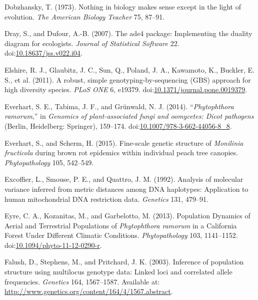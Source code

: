 \documentclass[double,12pt]{beavtex}
\begin{document}
  \hypertarget{ref-dobzhansky2013nothing}{}
  Dobzhansky, T. (1973). Nothing in biology makes sense except in the
  light of evolution. \emph{The American Biology Teacher} 75, 87--91.
  
  \hypertarget{ref-dray2007ade4}{}
  Dray, S., and Dufour, A.-B. (2007). The ade4 package: Implementing the
  duality diagram for ecologists. \emph{Journal of Statistical Software}
  22.
  doi:\href{https://doi.org/10.18637/jss.v022.i04}{10.18637/jss.v022.i04}.
  
  \hypertarget{ref-elshire2011robust}{}
  Elshire, R. J., Glaubitz, J. C., Sun, Q., Poland, J. A., Kawamoto, K.,
  Buckler, E. S., et al. (2011). A robust, simple genotyping-by-sequencing
  (GBS) approach for high diversity species. \emph{PLoS ONE} 6, e19379.
  doi:\href{https://doi.org/10.1371/journal.pone.0019379}{10.1371/journal.pone.0019379}.
  
  \hypertarget{ref-everhart2014phytophthora}{}
  Everhart, S. E., Tabima, J. F., and Grünwald, N. J. (2014).
  ``\emph{Phytophthora ramorum},'' in \emph{Genomics of plant-associated
  fungi and oomycetes: Dicot pathogens} (Berlin, Heidelberg: Springer),
  159--174.
  doi:\href{https://doi.org/10.1007/978-3-662-44056-8_8}{10.1007/978-3-662-44056-8\_8}.
  
  \hypertarget{ref-everhart2014fine}{}
  Everhart, S., and Scherm, H. (2015). Fine-scale genetic structure of
  \emph{Monilinia fructicola} during brown rot epidemics within individual
  peach tree canopies. \emph{Phytopathology} 105, 542--549.
  
  \hypertarget{ref-excoffier1992analysis}{}
  Excoffier, L., Smouse, P. E., and Quattro, J. M. (1992). Analysis of
  molecular variance inferred from metric distances among DNA haplotypes:
  Application to human mitochondrial DNA restriction data. \emph{Genetics}
  131, 479--91.
  
  \hypertarget{ref-eyre2013poulation}{}
  Eyre, C. A., Kozanitas, M., and Garbelotto, M. (2013). Population
  Dynamics of Aerial and Terrestrial Populations of \emph{Phytophthora
  ramorum} in a California Forest Under Different Climatic Conditions.
  \emph{Phytopathology} 103, 1141--1152.
  doi:\href{https://doi.org/10.1094/phyto-11-12-0290-r}{10.1094/phyto-11-12-0290-r}.
  
  \hypertarget{ref-Falush01082003}{}
  Falush, D., Stephens, M., and Pritchard, J. K. (2003). Inference of
  population structure using multilocus genotype data: Linked loci and
  correlated allele frequencies. \emph{Genetics} 164, 1567--1587.
  Available at: \url{http://www.genetics.org/content/164/4/1567.abstract}.
  
\end{document}
